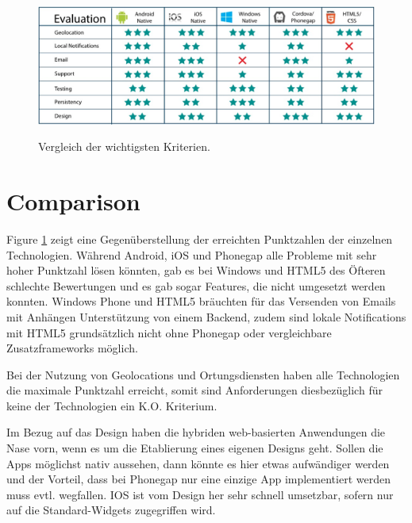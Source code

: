 \begin{figure}[t!]
\caption{Vergleich der wichtigsten Kriterien.}
\centering
\includegraphics[width=\textwidth]{resources/comparison.jpg}
\label{comparison}
\end{figure}

\section{Comparison}

Figure \ref{comparison} zeigt eine Gegenüberstellung der erreichten Punktzahlen der einzelnen Technologien. Während Android, iOS und Phonegap alle Probleme mit sehr hoher Punktzahl lösen könnten, gab es bei Windows und HTML5 des Öfteren schlechte Bewertungen und es gab sogar Features, die nicht umgesetzt werden konnten. Windows Phone und HTML5 bräuchten für das Versenden von Emails mit Anhängen Unterstützung von einem Backend, zudem sind lokale Notifications mit HTML5 grundsätzlich nicht ohne Phonegap oder vergleichbare Zusatzframeworks möglich.

Bei der Nutzung von Geolocations und Ortungsdiensten haben alle Technologien die maximale Punktzahl erreicht, somit sind Anforderungen diesbezüglich für keine der Technologien ein K.O. Kriterium.

Im Bezug auf das Design haben die hybriden web-basierten Anwendungen die Nase vorn, wenn es um die Etablierung eines eigenen Designs geht. Sollen die Apps möglichst nativ aussehen, dann könnte es hier etwas aufwändiger werden und der Vorteil, dass bei Phonegap nur eine einzige App implementiert werden muss evtl. wegfallen. IOS ist vom Design her sehr schnell umsetzbar, sofern nur auf die Standard-Widgets zugegriffen wird. 

